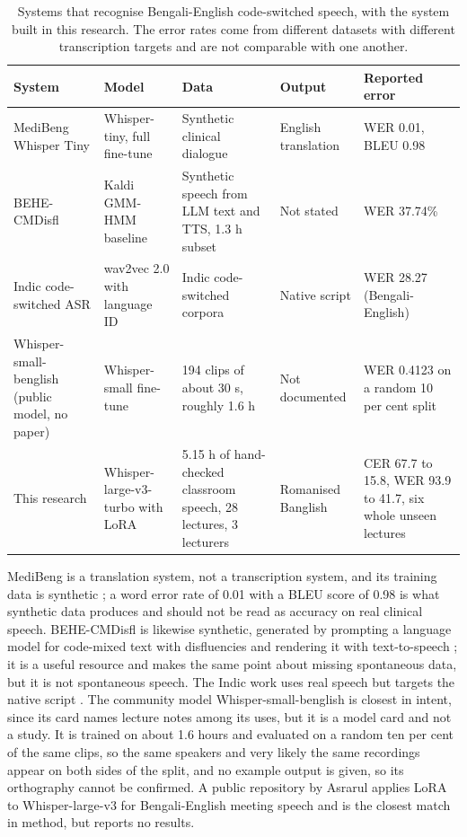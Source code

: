 \begin{table}[htbp]
\centering
\caption[Systems that recognise Bengali-English code-switched speech]{Systems that recognise Bengali-English code-switched speech, with the system
built in this research. The error rates come from different datasets with different
transcription targets and are not comparable with one another.}
\label{tab:neighbours}
\small
\begin{tabular}{p{2.8cm}p{2.3cm}p{3.1cm}p{2.0cm}p{2.5cm}}
\toprule
System & Model & Data & Output & Reported error \\
\midrule
MediBeng Whisper Tiny \cite{ghosh2025medibeng} &
Whisper-tiny, full fine-tune &
Synthetic clinical dialogue &
English translation &
WER 0.01, BLEU 0.98 \\
\addlinespace
BEHE-CMDisfl \cite{mitra2026behe} &
Kaldi GMM-HMM baseline &
Synthetic speech from LLM text and TTS, 1.3 h subset &
Not stated &
WER 37.74\% \\
\addlinespace
Indic code-switched ASR \cite{chadha2022indic} &
wav2vec 2.0 with language ID &
Indic code-switched corpora &
Native script &
WER 28.27 (Bengali-English) \\
\addlinespace
Whisper-small-\newline benglish \cite{bluepanther2024benglish} (public
model, no paper) &
Whisper-small fine-tune &
194 clips of about 30 s, roughly 1.6 h &
Not documented &
WER 0.4123 on a random 10 per cent split \\
\addlinespace
This research &
Whisper-large-v3-turbo with LoRA &
5.15 h of hand-checked classroom speech, 28 lectures, 3 lecturers &
Romanised Banglish &
CER 67.7 to 15.8, WER 93.9 to 41.7, six whole unseen lectures \\
\bottomrule
\end{tabular}
\end{table}

MediBeng is a translation system, not a transcription system, and its training
data is synthetic \cite{ghosh2025medibeng}; a word error rate of 0.01 with a BLEU score
of 0.98 is what synthetic data produces and should not be read as accuracy on real
clinical speech. BEHE-CMDisfl is likewise synthetic, generated by prompting a language
model for code-mixed text with disfluencies and rendering it with text-to-speech
\cite{mitra2026behe}; it is a useful resource and makes the same point about missing
spontaneous data, but it is not spontaneous speech. The Indic work uses real speech but
targets the native script \cite{chadha2022indic}. The community model
Whisper-small-benglish \cite{bluepanther2024benglish} is closest in intent, since its card names lecture notes
among its uses, but it is a model card and not a study. It is trained on about 1.6
hours and evaluated on a random ten per cent of the same clips, so the same speakers and
very likely the same recordings appear on both sides of the split, and no example output
is given, so its orthography cannot be confirmed. A public repository by Asrarul applies
LoRA to Whisper-large-v3 for Bengali-English meeting speech and is the closest match in
method, but reports no results.

